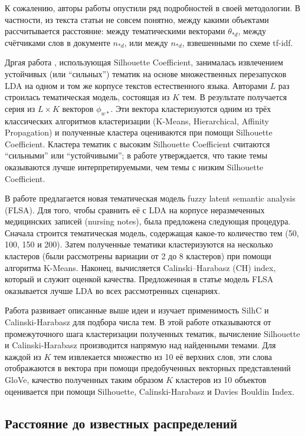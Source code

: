 К сожалению, авторы работы \cite{panichella2013effectively} опустили ряд подробностей в своей методологии. В частности, из текста статьи не совсем понятно, между какими объектами рассчитывается расстояние: между тематическими векторами $\theta_{\ast d}$, между счётчиками слов в документе $n_{\ast d}$, или между $n_{\ast d}$, взвешенными по схеме tf-idf.

Дргая работа \cite{mehta_clustering_bank}, использующая Silhouette Coefficient, занималась извлечением устойчивых (или ``сильных'') тематик на основе множественных перезапусков LDA на одном и том же корпусе текстов естественного языка. Авторами $L$ раз строилась тематическая модель, состоящая из $K$ тем. В результате получается серия из $L \times K$ векторов $\phi_{w \ast}$. Эти вектора кластеризуются одним из трёх классических алгоритмов кластеризации (K-Means, Hierarchical, Affinity Propagation) и полученные кластера оцениваются при помощи Silhouette Coefficient. Кластера тематик с высоким Silhouette Coefficient считаются ``сильными'' или ``устойчивыми''; в работе утверждается, что такие темы оказываются лучше интерпретируемыми, чем темы с низким Silhouette Coefficient.

В работе \cite{karami2018fuzzy} предлагается новая тематическая модель fuzzy latent semantic analysis (FLSA). Для того, чтобы сравнить её с LDA на корпусе неразмеченных медицинских записей (nursing notes), была предложена следующая процедура. Сначала строится тематическая модель, содержащая какое-то количество тем (50, 100, 150 и 200). Затем полученные тематики кластеризуются на несколько кластеров (были рассмотрены вариации от 2 до 8 кластеров) при помощи алгоритма K-Means. Наконец, вычисляется Calinski–Harabasz (CH) index, который и служит оценкой качества. Предложенная в статье модель FLSA оказывается лучше LDA во всех рассмотренных сценариях.

Работа \cite{krasnov19clustering} развивает описанные выше идеи и изучает применимость SilhC и Calinski-Harabasz для подбора числа тем. В этой работе отказываются от промежуточного шага кластеризации полученных тематик, вычисление Silhouette и Calinski-Harabasz производится напрямую над найденными темами. Для каждой из $K$ тем извлекается множество из 10 её верхних слов, эти слова отображаются в вектора при помощи предобученных векторных представлений GloVe, качество полученных таким образом $K$ кластеров из 10 объектов оценивается при помощи Silhouette, Calinski-Harabasz и Davies Bouldin Index.

\subsection{Расстояние до известных распределений}

